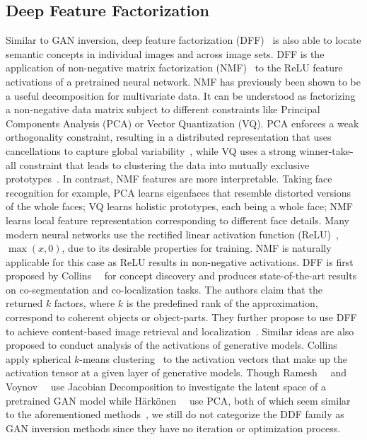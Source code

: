 \subsection{Deep Feature Factorization}
Similar to GAN inversion, deep feature factorization (DFF)~\cite{collins2018deep} is also able to locate semantic concepts in individual images and across image sets.  
DFF is the application of non-negative matrix factorization (NMF)~\cite{lee2001algorithms,lin2007projected} to the ReLU feature activations of a pretrained neural network. 
NMF has previously been shown to be a useful decomposition for multivariate data. It can be understood as factorizing a non-negative data matrix subject to different constraints like Principal Components Analysis (PCA) or Vector Quantization (VQ).
PCA enforces a weak orthogonality constraint, resulting in a distributed representation that uses cancellations to capture global variability~\cite{wold1987principal,turk1991eigenfaces}, while VQ uses a strong winner-take-all constraint that leads to clustering the data into mutually exclusive prototypes~\cite{gersho2012vector}. 
In contrast, NMF features are more interpretable.
Taking face recognition for example, PCA learns eigenfaces that resemble distorted versions of the whole faces; VQ learns holistic prototypes, each being a whole face; NMF learns local feature representation corresponding to different face details.
Many modern neural networks use the rectified linear activation function (ReLU)~\cite{nair2010rectified}, $\max (x, 0)$, due to its desirable properties for training. 
NMF is naturally applicable for this case as ReLU results in non-negative activations.
DFF is first proposed by Collins~\etal~\cite{collins2018deep} for concept discovery and produces state-of-the-art results on co-segmentation and co-localization tasks. The authors claim that the returned $k$ factors, where $k$ is the predefined rank of the approximation, correspond to coherent objects or object-parts.
They further propose to use DFF to achieve content-based image retrieval and localization~\cite{collins2019dff}.
Similar ideas are also proposed to conduct analysis of the activations of generative models. Collins~\etal~\cite{collins2020uncovering} apply spherical $k$-means clustering~\cite{buchta2012spherical} to the activation vectors that make up the activation tensor at a given layer of generative models.
Though Ramesh~\etal~\cite{ramesh2018spectral} and Voynov~\etal~\cite{voynov2020latent} use Jacobian Decomposition to investigate the latent space of a pretrained GAN model while Härkönen~\etal~\cite{eric2020GANSpace} use PCA, both of which seem similar to the aforementioned methods~\cite{collins2018deep,collins2019dff,collins2020uncovering}, we still do not categorize the DDF family as GAN inversion methods since they have no iteration or optimization process.

